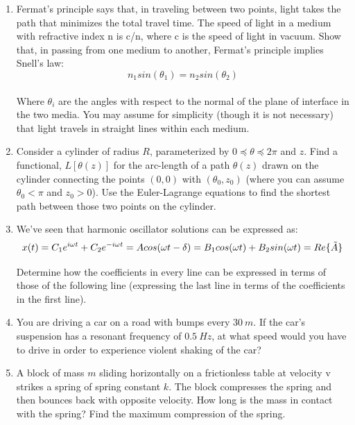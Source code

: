 \documentclass[fleqn]{article}
\begin{document}
  \begin{enumerate}
    \item Fermat’s principle says that, in traveling between two points, light takes
    the path that minimizes the total travel time. The speed of light in a
    medium with refractive index n is c/n, where c is the speed of light in
    vacuum. Show that, in passing from one medium to another, Fermat’s
    principle implies Snell’s law:
    $$n_1 sin(\theta_1)=n_2 sin(\theta_2)$$ \\
    Where $\theta_i$ are the angles with respect to the normal of the plane of
    interface in the two media. You may assume for simplicity (though it
    is not necessary) that light travels in straight lines within each medium.



    \item Consider a cylinder of radius $R$, parameterized by $0\preceq \theta \preceq 2\pi$ and $z$.
    Find a functional, $L\left[\theta(z)\right]$  for the arc-length of a path $\theta(z)$
    drawn on the cylinder connecting the points $(0,0)$ with $(\theta_0, z_0)$ (where you can
    assume $\theta_0 < \pi$ and $z_0 >0$). Use the Euler-Lagrange equations to find
    the shortest path between those two points on the cylinder.

    \item We’ve seen that harmonic oscillator solutions can be expressed as: 
    $$
    x(t)=C_1 e^{i\omega t}+C_2 e^{-i \omega t} \\
    =A cos(\omega t-\delta) \\
    =B_1 cos(\omega t)+B_2 sin(\omega t) \\
    =Re\{\tilde{A} \}
    $$

    Determine how the coefficients in every line can be expressed in terms
    of those of the following line (expressing the last line in terms of the
    coefficients in the first line).

    \item You are driving a car on a road with bumps every $30 ~ m$. If the car’s
    suspension has a resonant frequency of $0.5 ~ Hz$, at what speed would
    you have to drive in order to experience violent shaking of the car?


    \item A block of mass $m$ sliding horizontally on a frictionless table at velocity
    v strikes a spring of spring constant $k$. The block compresses the spring
    and then bounces back with opposite velocity. How long is the mass in
    contact with the spring? Find the maximum compression of the spring.



\end{enumerate}
\end{document}
